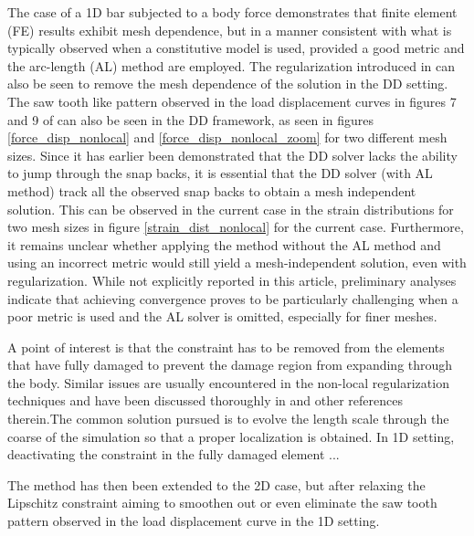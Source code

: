 \documentclass[10pt]{elsarticle}
\begin{document}
The case of a 1D bar subjected to a body force demonstrates that finite element (FE) results exhibit mesh dependence, but in a manner consistent with what is typically observed when a constitutive model is used, provided a good metric and the arc-length (AL) method are employed. The regularization introduced in \cite{Kamasamudram2023} can also be seen to remove the mesh dependence of the solution in the DD setting. The saw tooth like pattern observed in the load displacement curves in figures 7 and 9 of \cite{Kamasamudram2023} can also be seen in the DD framework, as seen in figures \ref{force_disp_nonlocal} and \ref{force_disp_nonlocal_zoom} for two different mesh sizes. Since it has earlier been demonstrated that the DD solver lacks the ability to jump through the snap backs, it is essential that the DD solver (with AL method) track all the observed snap backs to obtain a mesh independent solution. This can be observed in the current case in the strain distributions for two mesh sizes in figure \ref{strain_dist_nonlocal} for the current case. Furthermore, it remains unclear whether applying the method without the AL method and using an incorrect metric would still yield a mesh-independent solution, even with regularization. While not explicitly reported in this article, preliminary analyses indicate that achieving convergence proves to be particularly challenging when a poor metric is used and the AL solver is omitted, especially for finer meshes.


A point of interest is that the constraint has to be removed from the elements that have fully damaged to prevent the damage region from expanding through the body. Similar issues are usually encountered in the non-local regularization techniques and have been discussed thoroughly in \cite{Geers1998,Cabot2014,Le2018} and other references therein.The common solution pursued is to evolve the length scale through the coarse of the simulation so that a proper localization is obtained. In 1D setting, deactivating the constraint in the fully damaged element ...

The method has then been extended to the 2D case, but after relaxing the Lipschitz constraint aiming to smoothen out or even eliminate the saw tooth pattern observed in the load displacement curve in the 1D setting.  

\end{document}
